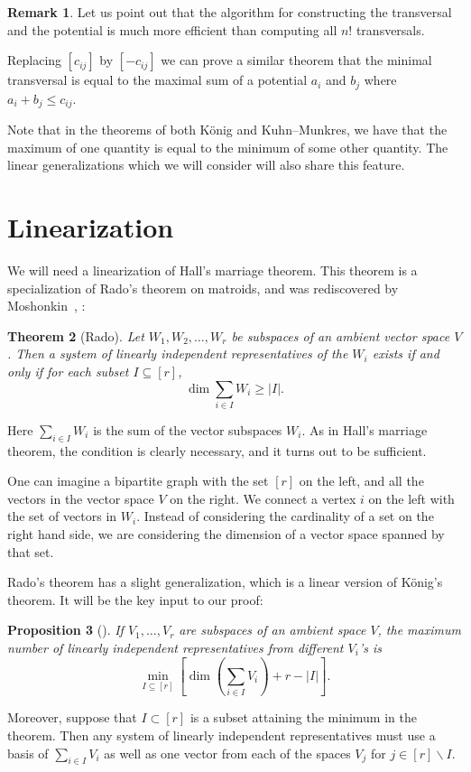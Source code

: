 \documentclass[10pt]{amsart}
\newtheorem{theorem}{Theorem}[section]
\newtheorem{prop}[theorem]{Proposition}
\theoremstyle{definition}
\newtheorem{rema}[theorem]{Remark}
\begin{document}
\begin{rema} \label{n!} Let us point out that the algorithm for constructing the transversal and the potential is much more efficient than computing all $n!$ transversals.
\end{rema}

Replacing $[c_{ij}]$ by $[-c_{ij}]$ we can prove a similar theorem that the minimal transversal is equal to the maximal sum of a potential $a_i$ and $b_j$ where $a_i + b_j \leq c_{ij}$.

Note that in the theorems of both K{\"o}nig and Kuhn--Munkres, we have that the maximum of one quantity is equal to the minimum of some other quantity. The linear generalizations which we will consider will also share this feature.


\section{Linearization}\label{sect3}

We will need a linearization of Hall's marriage theorem. This theorem is a specialization of Rado's theorem on matroids, and was rediscovered by Moshonkin~\cite{R}, \cite{M}:
\begin{theorem}[Rado] \label{lin1}
Let $W_1, W_2, \dots, W_r$ be subspaces of an ambient vector space $V$. Then a system of linearly independent representatives of the $W_i$ exists if and only if for each subset $I \subseteq [r]$,
\[
 \dim \sum_{i \in I} W_i \geq |I|.
\]
\end{theorem}

Here $\sum_{i \in I} W_i$ is the sum of the vector subspaces $W_i$. As in Hall's marriage theorem, the condition is clearly necessary, and it turns out to be sufficient. 

One can imagine a bipartite graph with the set $[r]$ on the left, and all the vectors in the vector space $V$ on the right. We connect a vertex $i$ on the left with the set of vectors in $W_i$. Instead of considering the cardinality of a set on the right hand side, we are considering the dimension of a vector space spanned by that set.

Rado's theorem has a slight generalization, which is a linear version of K{\"o}nig's theorem. It will be the key input to our proof:

\begin{prop}[\cite{LO}]\label{lin2}
If $V_1,\ldots,V_r$ are subspaces of an ambient space $V$, the maximum number of linearly independent representatives from different $V_i$'s is
 \begin{equation}\label{eq:vsKonig}
 \min_{I \subseteq [r]} \left[ \dim \left( \sum_{i\in I} V_i \right) + r - |I| \right].
 \end{equation}
\end{prop}
Moreover, suppose that $I \subset [r]$ is a subset attaining the minimum in the theorem. Then any system of linearly independent representatives must use a basis of $\sum_{i\in I} V_i$ as well as one vector from each of the spaces $V_j$ for $j \in [r] \backslash I$.
\end{document}
